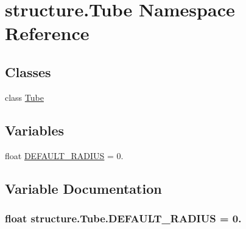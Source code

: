 \hypertarget{namespacestructure_1_1_tube}{\section{structure.\-Tube Namespace Reference}
\label{namespacestructure_1_1_tube}
}
\subsection*{Classes}
\begin{DoxyCompactItemize}
\item 
class \hyperlink{classstructure_1_1_tube_1_1_tube}{Tube}
\end{DoxyCompactItemize}
\subsection*{Variables}
\begin{DoxyCompactItemize}
\item 
float \hyperlink{namespacestructure_1_1_tube_a05e0538183415553c9a31820cf11dd3b}{D\-E\-F\-A\-U\-L\-T\-\_\-\-R\-A\-D\-I\-U\-S} = 0.
\end{DoxyCompactItemize}


\subsection{Variable Documentation}
\hypertarget{namespacestructure_1_1_tube_a05e0538183415553c9a31820cf11dd3b}{
\subsubsection[{D\-E\-F\-A\-U\-L\-T\-\_\-\-R\-A\-D\-I\-U\-S}]{\setlength{\rightskip}{0pt plus 5cm}float structure.\-Tube.\-D\-E\-F\-A\-U\-L\-T\-\_\-\-R\-A\-D\-I\-U\-S = 0.}}\label{namespacestructure_1_1_tube_a05e0538183415553c9a31820cf11dd3b}
